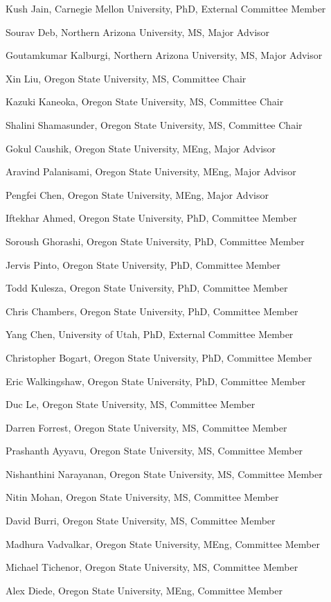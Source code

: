\documentclass[ComputerScience]{vita}
\begin{document}
\begin{vita}
\begin{Other Graduated Students}
\item Kush Jain, Carnegie Mellon University, PhD, External Committee Member  
\item Sourav Deb, Northern Arizona University, MS, Major Advisor 
\item  Goutamkumar Kalburgi, Northern Arizona University, MS, Major Advisor
\item Xin Liu, Oregon State University, MS, Committee Chair 
\item Kazuki Kaneoka, Oregon State University, MS, Committee Chair 
\item Shalini Shamasunder, Oregon State University, MS, Committee Chair
\item Gokul Caushik, Oregon State University, MEng, Major Advisor
\item Aravind Palanisami, Oregon State University, MEng, Major Advisor
\item Pengfei Chen, Oregon State University, MEng, Major Advisor
\item Iftekhar Ahmed, Oregon State University, PhD, Committee Member
\item Soroush Ghorashi, Oregon State University, PhD, Committee Member
\item Jervis Pinto, Oregon State University, PhD, Committee Member
\item Todd Kulesza, Oregon State University, PhD, Committee Member
\item Chris Chambers, Oregon State University, PhD, Committee Member
\item Yang Chen, University of Utah, PhD, External Committee Member
\item Christopher Bogart, Oregon State University, PhD, Committee Member
\item Eric Walkingshaw, Oregon State University, PhD, Committee Member
\item Duc Le, Oregon State University, MS, Committee Member
\item Darren Forrest, Oregon State University, MS, Committee Member
\item Prashanth Ayyavu, Oregon State University, MS, Committee Member
\item Nishanthini Narayanan, Oregon State University, MS, Committee Member
\item Nitin Mohan, Oregon State University, MS, Committee Member
\item David Burri, Oregon State University, MS, Committee Member
\item Madhura Vadvalkar, Oregon State University, MEng, Committee Member
\item Michael Tichenor, Oregon State University, MS, Committee Member
\item Alex Diede, Oregon State University, MEng, Committee Member
\end{Other Graduated Students}




\end{vita}
\end{document}
